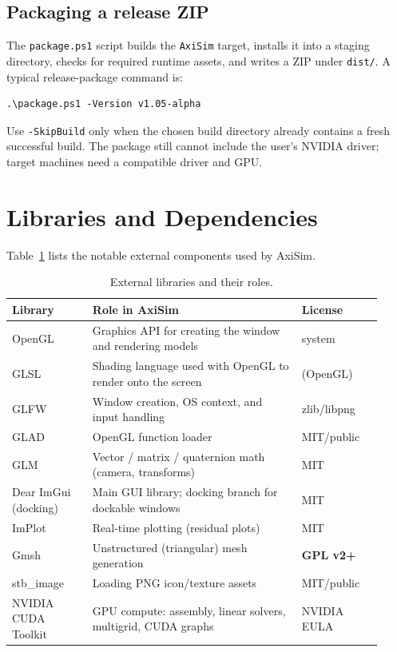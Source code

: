 \documentclass[11pt]{article}
\begin{document}
\subsection{Packaging a release ZIP}
The \texttt{package.ps1} script builds the \texttt{AxiSim} target, installs it into a
staging directory, checks for required runtime assets, and writes a ZIP under
\texttt{dist/}. A typical release-package command is:
\begin{lstlisting}[language={}]
.\package.ps1 -Version v1.05-alpha
\end{lstlisting}
Use \texttt{-SkipBuild} only when the chosen build directory already contains a fresh
successful build. The package still cannot include the user's NVIDIA driver; target
machines need a compatible driver and GPU.

\section{Libraries and Dependencies}\label{sec:libraries}
Table~\ref{tab:libs} lists the notable external components used by AxiSim.

\begin{table}[h]
\centering
\caption{External libraries and their roles.}
\label{tab:libs}
\begin{tabular}{@{}>{\raggedright\arraybackslash}p{0.20\linewidth}
                   >{\raggedright\arraybackslash}p{0.52\linewidth}
                   >{\raggedright\arraybackslash}p{0.20\linewidth}@{}}
\toprule
\textbf{Library} & \textbf{Role in AxiSim} & \textbf{License} \\
\midrule
OpenGL              & Graphics API for creating the window and rendering models       & system \\
GLSL                & Shading language used with OpenGL to render onto the screen      & (OpenGL) \\
GLFW                & Window creation, OS context, and input handling                  & zlib/libpng \\
GLAD                & OpenGL function loader                                            & MIT/public \\
GLM                 & Vector / matrix / quaternion math (camera, transforms)           & MIT \\
Dear ImGui (docking)& Main GUI library; docking branch for dockable windows           & MIT \\
ImPlot              & Real-time plotting (residual plots)                              & MIT \\
Gmsh                & Unstructured (triangular) mesh generation                        & \textbf{GPL v2+} \\
stb\_image          & Loading PNG icon/texture assets                                  & MIT/public \\
NVIDIA CUDA Toolkit & GPU compute: assembly, linear solvers, multigrid, CUDA graphs    & NVIDIA EULA \\
\bottomrule
\end{tabular}
\end{table}
\end{document}
